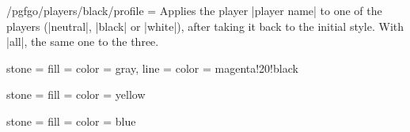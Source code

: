 \begin{key}{/pgfgo/players/black/profile = }
	Applies the player |player name| to one of the players (|neutral|, |black| or |white|), after taking it back to the initial style. With |all|, the same one to the three.
	\begin{codeexample}
	\end{codeexample}
\end{key}

\begin{codeexample}[width=3cm]
	{stone = {
			fill = {color = gray},
			line = {color = magenta!20!black}}
	}

	{stone = {fill = {color = yellow}}}

	{stone = {fill = {color = blue}}}


	\begin{goban}[partial = A1:C3]
	\end{goban}
\end{codeexample}

